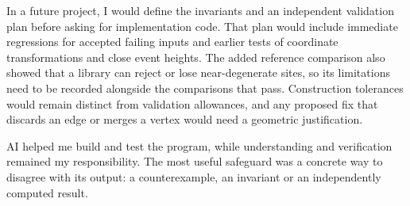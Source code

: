 In a future project, I would define the invariants and an independent validation plan before asking for implementation code. That plan would include immediate regressions for accepted failing inputs and earlier tests of coordinate transformations and close event heights. The added reference comparison also showed that a library can reject or lose near-degenerate sites, so its limitations need to be recorded alongside the comparisons that pass. Construction tolerances would remain distinct from validation allowances, and any proposed fix that discards an edge or merges a vertex would need a geometric justification.

AI helped me build and test the program, while understanding and verification remained my responsibility. The most useful safeguard was a concrete way to disagree with its output: a counterexample, an invariant or an independently computed result.
